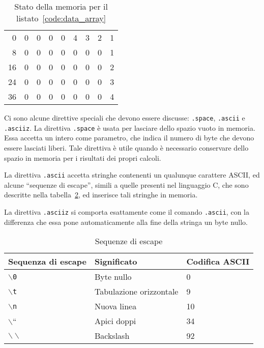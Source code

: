 \documentclass[12pt]{report}
\begin{document}
\begin{table}[htb]
	\begin{centering}
		\begin{tabular}{r|c|c|c|c|c|c|c|c|}
			\cline{2-9}
			0 & 0 & 0 & 0 & 0 &4 & 3 &2 &1 \\
			\cline{2-9}
			8 & 0 & 0 & 0 & 0 &0 & 0 &0 &1 \\
			\cline{2-9}
			16 & 0 & 0 & 0 & 0 &0 & 0 &0 &2 \\
			\cline{2-9}
			24 & 0 & 0 & 0 & 0 &0 & 0 &0 &3 \\
			\cline{2-9}
			36 & 0 & 0 & 0 & 0 &0 & 0 &0 &4\\ 
			\cline{2-9}
		\end{tabular}
		\caption{Stato della memoria per il listato~\ref{code:data_array}}
		\label{table:effect}
	\end{centering}
\end{table}
Ci sono alcune direttive speciali che devono essere discusse: \texttt{.space}, 
\texttt{.ascii} e \texttt{.asciiz}.
La direttiva \texttt{.space} \`{e} usata per lasciare dello spazio vuoto in memoria. 
Essa accetta un intero come parametro, che indica il numero di byte che devono essere lasciati liberi. 
Tale direttiva \`{e} utile quando \`{e} necessario conservare dello spazio in memoria per i risultati dei propri calcoli.

La direttiva \texttt{.ascii} accetta stringhe contenenti un qualunque carattere ASCII, 
ed alcune ``sequenze di escape'', simili a quelle presenti nel linguaggio C, che sono descritte nella 
tabella~\ref{table:escaping}, ed inserisce tali stringhe in memoria.

La direttiva \texttt{.asciiz} si comporta esattamente come il comando \texttt{.ascii},
con la differenza che essa pone automaticamente alla fine della stringa un byte nullo.

\begin{table}[!htb]
	\begin{tabular}{lll}
		\hline
		\hline
		Sequenza di escape & Significato & Codifica ASCII\\
		\hline
		\texttt{$\backslash$0} & Byte nullo & 0\\
		\texttt{$\backslash$t} & Tabulazione orizzontale & 9\\
		\texttt{$\backslash$n} & Nuova linea & 10\\
		\texttt{$\backslash$}`` & Apici doppi & 34\\
		\texttt{$\backslash\backslash$} & Backslash & 92
	\end{tabular}
	\caption{Sequenze di escape}
	\label{table:escaping}
\end{table}
\end{document}
